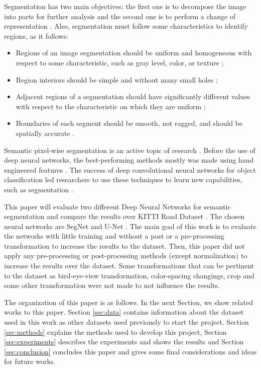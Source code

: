 \documentclass[10pt,twocolumn,letterpaper]{article}
\begin{document}
Segmentation has two main objectives: the first one is to decompose the image into parts for further analysis and the second one is to perform a change of representation \cite{DOMINGUEZ}. Also, segmentation must follow some characteristics to identify regions, as it follows:

\begin{itemize}
 \item Regions of an image segmentation should be uniform and homogeneous with respect to some characteristic, such as gray level, color, or texture \cite{DOMINGUEZ};
 \item Region interiors should be simple and without many small holes \cite{DOMINGUEZ};
 \item Adjacent regions of a segmentation should have significantly different values with respect to the characteristic on which they are uniform \cite{DOMINGUEZ};
 \item Boundaries of each segment should be smooth, not ragged, and should be spatially accurate \cite{DOMINGUEZ}.
\end{itemize}

Semantic pixel-wise segmentation is an active topic of research \cite{SEGNET}. Before the use of deep neural networks, the best-performing methods mostly was made using hand engineered features \cite{SEGNET}. The success of deep convolutional neural networks for object classification led researchers to use these techniques to learn new capabilities, such as segmentation \cite{SEGNET}.

This paper will evaluate two different Deep Neural Networks for semantic segmentation and compare the results over KITTI Road Dataset \cite{KITTI}. The chosen neural networks are SegNet \cite{SEGNET} and U-Net \cite{UNET}. The main goal of this work is to evaluate the networks with little training and without a post or a pre-processing transformation to increase the results to the dataset. Then, this paper did not apply any pre-processing or post-processing methods (except normalization) to increase the results over the dataset. Some transformations that can be pertinent to the dataset as bird-eye-view transformation, color-spacing changings, crop and some other transformation were not made to not influence the results.

The organization of this paper is as follows. In the next Section, we show related works to this paper. Section \ref{sec:data} contains information about the dataset used in this work as other datasets used previously to start the project. Section \ref{sec:methods} explains the methods used to develop this project, Section \ref{sec:experiments} describes the experiments and shows the results and Section \ref{sec:conclusion} concludes this paper and gives some final considerations and ideas for future works.
\end{document}
